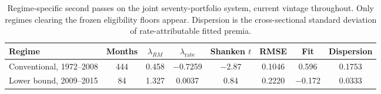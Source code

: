 \begin{table}[htbp]
\centering
\caption{Regime-specific second passes on the joint seventy-portfolio system,
current vintage throughout. Only regimes clearing the frozen eligibility floors
appear. Dispersion is the cross-sectional standard deviation of
rate-attributable fitted premia.}
\label{tab:regimes}
\begin{tabular}{lccccccc}
\toprule
Regime & Months & $\lambda_{RM}$ & $\lambda_{\text{rate}}$ & Shanken $t$ & RMSE & Fit & Dispersion \\
\midrule
Conventional, 1972--2008 & 444 & 0.458 & $-$0.7259 & $-$2.87 & 0.1046 & 0.596 & 0.1753 \\ %
Lower bound, 2009--2015 & 84 & 1.327 & 0.0037 & 0.84 & 0.2220 & $-$0.172 & 0.0333 \\ %
\bottomrule
\end{tabular}
\end{table}
